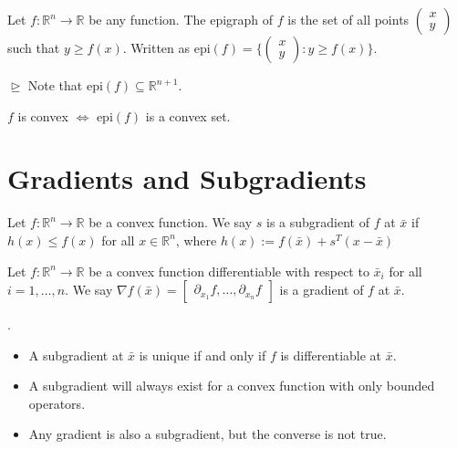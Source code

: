 \documentclass[a4paper]{report}
\newcommand{\m}[1]{\begin{pmatrix}
	#1
\end{pmatrix}}
\begin{document}
    \begin{definition}[Epigraphs]
        Let $f : \mathbb{R}^{n} \rightarrow \mathbb{R}$ be any function. The
        epigraph of $f$ is the set of all points $\m{x \\ y}$ such that $y \geq f(x)$.
        Written as $\text{epi}(f) = \Bigg\{\m{x \\ y} : y \geq f(x)\Bigg\}$. 
        
        $\trianglerighteq$ Note that $\text{epi}(f) \subseteq \mathbb{R}^{n+1}$.
        \begin{corollary}
            $f$ is convex $\iff$ $\text{epi}(f)$ is a convex set.
        \end{corollary}
    \end{definition}

	\section{Gradients and Subgradients}
	\begin{definition}[Subgradient]
		\label{subgradient} Let $f : \mathbb{R}^{n} \rightarrow \mathbb{R}$ be a convex
		function. We say $s$ is a subgradient of $f$ at $\bar x$ if $h(x) \leq f(x)$
		for all $x \in \mathbb{R}^{n}$, where $h(x) := f(\bar x) + s^{T} (x - \bar x)$
	\end{definition}
	\begin{definition}[Gradient]
		Let $f : \mathbb{R}^{n} \rightarrow \mathbb{R}$ be a convex function differentiable
		with respect to $\bar x_{i}$ for all $i = 1, \dots, n$. We say
		$\nabla f(\bar x) =
		\begin{bmatrix}
			\partial_{x_1}f, \dots, \partial_{x_n}f
		\end{bmatrix}$ is a gradient of $f$ at $\bar x$.
	\end{definition}

	\begin{proposition}
		\label{prop} . \\
		\begin{itemize}
			\item A subgradient at $\bar x$ is unique if and only if $f$ is differentiable
				at $\bar x$.

			\item A subgradient will always exist for a convex function with only bounded
				operators.

			\item Any gradient is also a subgradient, but the converse is not true.
		\end{itemize}
	\end{proposition}
\end{document}
